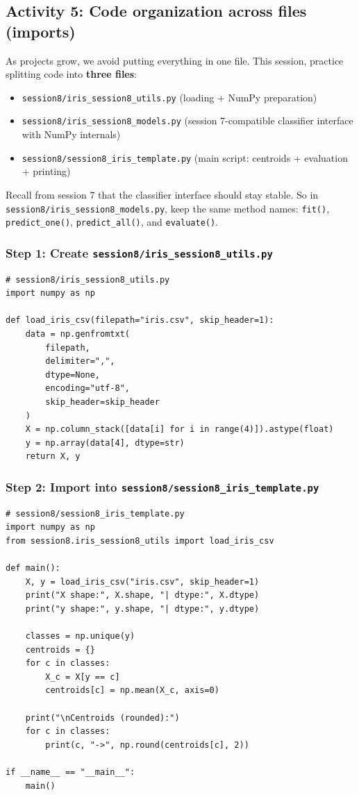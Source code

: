 \newpage
\subsection{Activity 5: Code organization across files (imports)}

\noindent
As projects grow, we avoid putting everything in one file. This session, practice splitting code into \textbf{three files}:

\begin{itemize}\setlength{\itemsep}{0pt}
\item \texttt{session8/iris\_session8\_utils.py} (loading + NumPy preparation)
\item \texttt{session8/iris\_session8\_models.py} (session 7-compatible classifier interface with NumPy internals)
\item \texttt{session8/session8\_iris\_template.py} (main script: centroids + evaluation + printing)
\end{itemize}

\noindent
Recall from session 7 that the classifier interface should stay stable.
So in \texttt{session8/iris\_session8\_models.py}, keep the same method names:
\texttt{fit()}, \texttt{predict\_one()}, \texttt{predict\_all()}, and \texttt{evaluate()}.

\subsubsection{Step 1: Create \texttt{session8/iris\_session8\_utils.py}}
\begin{verbatim}
# session8/iris_session8_utils.py
import numpy as np

def load_iris_csv(filepath="iris.csv", skip_header=1):
    data = np.genfromtxt(
        filepath,
        delimiter=",",
        dtype=None,
        encoding="utf-8",
        skip_header=skip_header
    )
    X = np.column_stack([data[i] for i in range(4)]).astype(float)
    y = np.array(data[4], dtype=str)
    return X, y
\end{verbatim}

\subsubsection{Step 2: Import into \texttt{session8/session8\_iris\_template.py}}
\begin{verbatim}
# session8/session8_iris_template.py
import numpy as np
from session8.iris_session8_utils import load_iris_csv

def main():
    X, y = load_iris_csv("iris.csv", skip_header=1)
    print("X shape:", X.shape, "| dtype:", X.dtype)
    print("y shape:", y.shape, "| dtype:", y.dtype)

    classes = np.unique(y)
    centroids = {}
    for c in classes:
        X_c = X[y == c]
        centroids[c] = np.mean(X_c, axis=0)

    print("\nCentroids (rounded):")
    for c in classes:
        print(c, "->", np.round(centroids[c], 2))

if __name__ == "__main__":
    main()
\end{verbatim}

